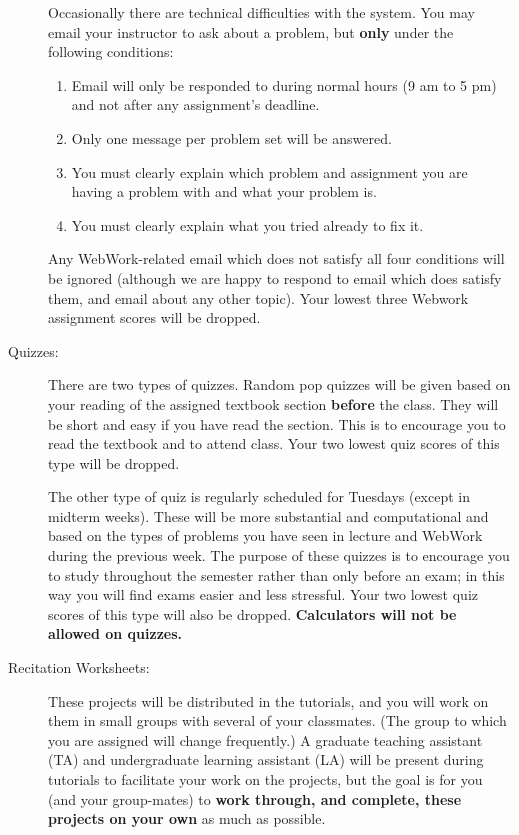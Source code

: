 \documentclass[11pt]{article}
\begin{document}
\begin{description}
  Occasionally there are technical difficulties with the system. You
  may email your instructor to ask about a problem, but \textbf{only}
  under the following conditions:
  \begin{enumerate}
  \item Email will only be responded to during normal hours (9 am to 5
    pm) and not after any assignment's deadline.
  \item Only one message per problem set will be answered.
  \item You must clearly explain which problem and assignment you are
    having a problem with and what your problem is.
  \item You must clearly explain what you tried already to fix it.
  \end{enumerate}
  Any WebWork-related email which does not satisfy all four conditions
  will be ignored (although we are happy to respond to email which
  does satisfy them, and email about any other topic).  Your lowest
  three Webwork assignment scores will be dropped.

\item[Quizzes:] There are two types of quizzes. Random pop quizzes
  will be given based on your reading of the assigned textbook section
  \textbf{before} the class. They will be short and easy if you have
  read the section. This is to encourage you to read the textbook and
  to attend class. Your two lowest quiz scores of this type will be
  dropped.

  The other type of quiz is regularly scheduled for Tuesdays (except
  in midterm weeks). These will be more substantial and computational
  and based on the types of problems you have seen in lecture and
  WebWork during the previous week. The purpose of these quizzes is to
  encourage you to study throughout the semester rather than only
  before an exam; in this way you will find exams easier and less
  stressful. Your two lowest quiz scores of this type will also be
  dropped. \textbf{Calculators will not be allowed on quizzes.}

\item[Recitation Worksheets:] These projects will be distributed in
  the tutorials, and you will work on them in small groups with
  several of your classmates. (The group to which you are assigned
  will change frequently.)  A graduate teaching assistant (TA) and
  undergraduate learning assistant (LA) will be present during
  tutorials to facilitate your work on the projects, but the goal is
  for you (and your group-mates) to \textbf{work through, and
    complete, these projects on your own} as much as possible.


\end{description}
\end{document}
